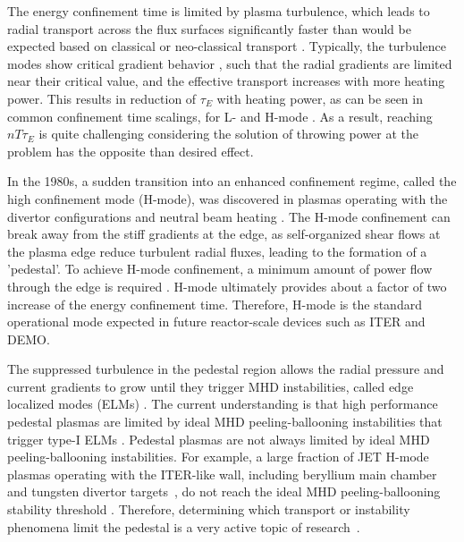 \documentclass[a4paper, twoside, final, 12pt]{article}
\begin{document}
The energy confinement time is limited by plasma turbulence, which leads to radial transport across the flux surfaces significantly faster than would be expected based on classical or neo-classical transport \cite{Ikeda_2007}.
Typically, the turbulence modes show critical gradient behavior \cite{Ikeda_2007}, such that the radial gradients are limited near their critical value, and the effective transport increases with more heating power.
This results in reduction of $\tau_E$ with heating power, as can be seen in common confinement time scalings, for L- and H-mode \cite{Ikeda_2007}. As a result, reaching $nT\tau_E$ is quite challenging considering the solution of throwing power at the problem has the opposite than desired effect.

In the 1980s, a sudden transition into an enhanced confinement regime, called the high confinement mode (H-mode), was discovered in plasmas operating with the divertor configurations and neutral beam heating \cite{PhysRevLett}.
The H-mode confinement can break away from the stiff gradients at the edge, as self-organized shear flows at the plasma edge reduce turbulent radial fluxes, leading to the formation of a 'pedestal'.
To achieve H-mode confinement, a minimum amount of power flow through the edge is required \cite{Martin_2008}. H-mode ultimately provides about a factor of two increase of the energy confinement time. Therefore, H-mode is the standard operational mode expected in future reactor-scale devices such as ITER and DEMO.

The suppressed turbulence in the pedestal region allows the radial pressure  and current gradients to grow until they trigger MHD instabilities, called edge localized modes (ELMs) \cite{ELM_s, Viezzer_2018}.
The current understanding is that high performance pedestal plasmas are limited by ideal MHD peeling-ballooning instabilities that trigger type-I ELMs \cite{ELM_s}.
Pedestal plasmas are not always limited by ideal MHD peeling-ballooning instabilities.
For example, a large fraction of JET H-mode plasmas operating with the ITER-like wall, including beryllium main chamber and tungsten divertor targets~\cite{PHILIPPS20101581}, do not reach the ideal MHD peeling-ballooning stability threshold \cite{Frassinetti_2020}.  Therefore, determining which transport or instability phenomena limit the pedestal is a very active topic of research~\cite{electron_transport, Catto_2013, Kotschenreuther_2019}.
\end{document}
